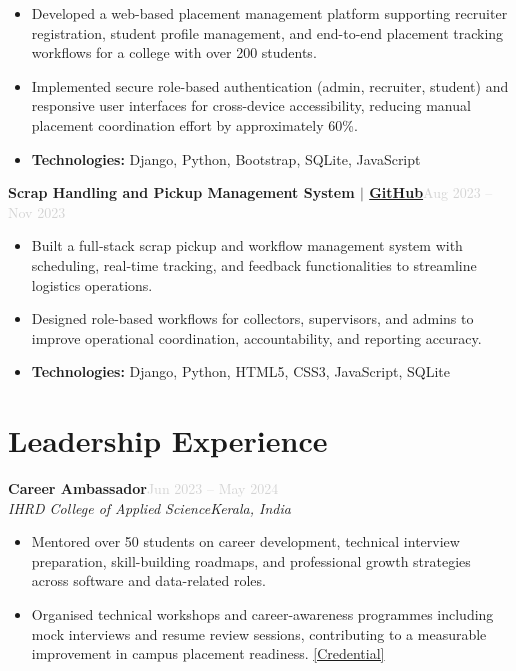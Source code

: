 \documentclass[a4paper,10.5pt]{article}
\newcommand{\resumeEntry}[4]{%
  \vspace{3pt}%
  \noindent\textbf{\normalsize #1}\hfill\textcolor{lightgray}{\small #2}\\%
  \noindent\textit{\small #3}\hfill\textit{\small #4}%
  \vspace{2pt}%
}
\newcommand{\resumeProject}[2]{%
  \vspace{3pt}%
  \noindent\textbf{\normalsize #1}\hfill\textcolor{lightgray}{\small #2}%
  \vspace{1pt}%
}
\newcommand{\resumeItem}[1]{%
  \item\small{#1}%
}
\newcommand{\resumeItemListStart}{%
  \begin{itemize}[leftmargin=0.18in, itemsep=1pt, topsep=2pt, parsep=0pt]%
}
\newcommand{\resumeItemListEnd}{%
  \end{itemize}\vspace{1pt}%
}
\begin{document}
\resumeItemListStart
  \resumeItem{
    Developed a web-based placement management platform supporting recruiter registration, student profile management, and end-to-end placement tracking workflows for a college with over 200 students.
  }
  \resumeItem{
    Implemented secure role-based authentication (admin, recruiter, student) and responsive user interfaces for cross-device accessibility, reducing manual placement coordination effort by approximately 60\%.
  }
  \resumeItem{
    \textbf{Technologies:} Django, Python, Bootstrap, SQLite, JavaScript
  }
\resumeItemListEnd

\vspace{4pt}

\resumeProject
  {Scrap Handling and Pickup Management System $|$ \href{https://github.com/Abhijith-E/smart-scrap-management-system}{GitHub}}{Aug 2023 -- Nov 2023}

\resumeItemListStart
  \resumeItem{
    Built a full-stack scrap pickup and workflow management system with scheduling, real-time tracking, and feedback functionalities to streamline logistics operations.
  }
  \resumeItem{
    Designed role-based workflows for collectors, supervisors, and admins to improve operational coordination, accountability, and reporting accuracy.
  }
  \resumeItem{
    \textbf{Technologies:} Django, Python, HTML5, CSS3, JavaScript, SQLite
  }
\resumeItemListEnd


\section{Leadership Experience}

\resumeEntry
  {Career Ambassador}{Jun 2023 -- May 2024}
  {IHRD College of Applied Science}{Kerala, India}

\resumeItemListStart
  \resumeItem{
    Mentored over 50 students on career development, technical interview preparation, skill-building roadmaps, and professional growth strategies across software and data-related roles.
  }
  \resumeItem{
    Organised technical workshops and career-awareness programmes including mock interviews and resume review sessions, contributing to a measurable improvement in campus placement readiness.
    \href{https://github.com/Abhijith-E/leadership-and-professional-credentials/blob/main/Career_Ambassador_Certificate.pdf}{[Credential]}
  }
\resumeItemListEnd

\end{document}
